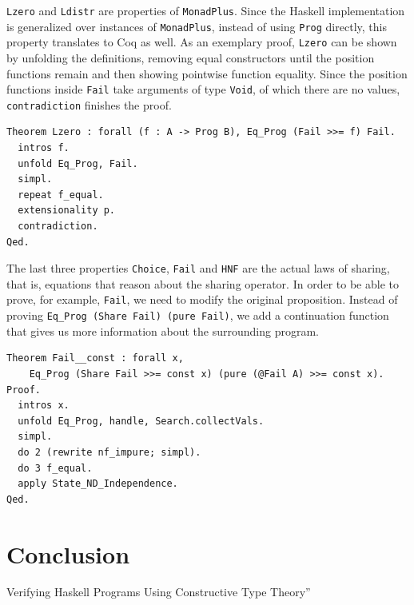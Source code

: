 \documentclass[a4paper, 11pt, fleqn, twoside]{scrreprt}
\newcommand{\hinl}[1]{\texttt{#1}}
\newcommand{\cinl}[1]{\texttt{#1}}
\begin{document}
\cinl{Lzero} and \cinl{Ldistr} are properties of \hinl{MonadPlus}.
Since the Haskell implementation is generalized over instances of \cinl{MonadPlus}, instead of using \cinl{Prog} directly, this property translates to Coq as well.
As an exemplary proof, \cinl{Lzero} can be shown by unfolding the definitions, removing equal constructors until the position functions remain and then showing pointwise function equality.
Since the position functions inside \cinl{Fail} take arguments of type \cinl{Void}, of which there are no values, \cinl{contradiction} finishes the proof.

\begin{verbatim}
Theorem Lzero : forall (f : A -> Prog B), Eq_Prog (Fail >>= f) Fail.
  intros f.
  unfold Eq_Prog, Fail.
  simpl.
  repeat f_equal.
  extensionality p.
  contradiction.
Qed.
\end{verbatim}

The last three properties \cinl{Choice}, \cinl{Fail} and \cinl{HNF} are the actual laws of sharing, that is, equations that reason about the sharing operator.
In order to be able to prove, for example, \cinl{Fail}, we need to modify the original proposition.
Instead of proving \cinl{Eq_Prog (Share Fail) (pure Fail)}, we add a continuation function that gives us more information about the surrounding program.

\begin{verbatim}
Theorem Fail__const : forall x,
    Eq_Prog (Share Fail >>= const x) (pure (@Fail A) >>= const x).
Proof. 
  intros x. 
  unfold Eq_Prog, handle, Search.collectVals.
  simpl.
  do 2 (rewrite nf_impure; simpl).
  do 3 f_equal.
  apply State_ND_Independence. 
Qed.
\end{verbatim}


\chapter{Conclusion}
Verifying Haskell Programs Using Constructive Type Theory”


\appendix
\end{document}
